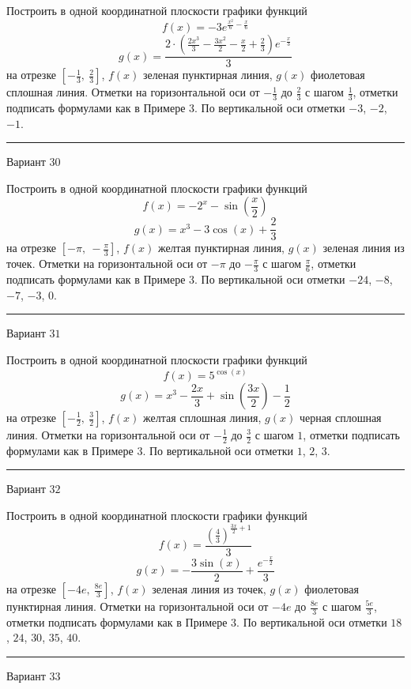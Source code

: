 \documentclass[11pt]{report}
\begin{document}
Построить в одной координатной плоскости графики функций $$f(x) = - 3 e^{\frac{x^{2}}{6} - \frac{x}{6}}$$ $$g(x) = \frac{2 \cdot \left(\frac{2 x^{3}}{3} - \frac{3 x^{2}}{2} - \frac{x}{2} + \frac{2}{3}\right) e^{- \frac{x}{3}}}{3}$$ на отрезке $\left[- \frac{1}{3}, \  \frac{2}{3}\right]$, $f(x)$ зеленая пунктирная линия, $g(x)$ фиолетовая сплошная линия. Отметки на горизонтальной оси от $- \frac{1}{3}$ до $\frac{2}{3}$ с шагом $\frac{1}{3}$, отметки подписать формулами как в Примере 3. По вертикальной оси отметки $-3$, $-2$, $-1$.
\begin{center}
\noindent\rule{8cm}{0.4pt}
\end{center}
Вариант $30$


Построить в одной координатной плоскости графики функций $$f(x) = - 2^{x} - \sin{\left(\frac{x}{2} \right)}$$ $$g(x) = x^{3} - 3 \cos{\left(x \right)} + \frac{2}{3}$$ на отрезке $\left[- \pi, \  - \frac{\pi}{3}\right]$, $f(x)$ желтая пунктирная линия, $g(x)$ зеленая линия из точек. Отметки на горизонтальной оси от $- \pi$ до $- \frac{\pi}{3}$ с шагом $\frac{\pi}{6}$, отметки подписать формулами как в Примере 3. По вертикальной оси отметки $-24$, $-8$, $-7$, $-3$, $0$.
\begin{center}
\noindent\rule{8cm}{0.4pt}
\end{center}
Вариант $31$


Построить в одной координатной плоскости графики функций $$f(x) = 5^{\cos{\left(x \right)}}$$ $$g(x) = x^{3} - \frac{2 x}{3} + \sin{\left(\frac{3 x}{2} \right)} - \frac{1}{2}$$ на отрезке $\left[- \frac{1}{2}, \  \frac{3}{2}\right]$, $f(x)$ желтая сплошная линия, $g(x)$ черная сплошная линия. Отметки на горизонтальной оси от $- \frac{1}{2}$ до $\frac{3}{2}$ с шагом $1$, отметки подписать формулами как в Примере 3. По вертикальной оси отметки $1$, $2$, $3$.
\begin{center}
\noindent\rule{8cm}{0.4pt}
\end{center}
Вариант $32$


Построить в одной координатной плоскости графики функций $$f(x) = \frac{\left(\frac{4}{3}\right)^{\frac{3 x}{2} + 1}}{3}$$ $$g(x) = - \frac{3 \sin{\left(x \right)}}{2} + \frac{e^{- \frac{x}{2}}}{3}$$ на отрезке $\left[- 4 e, \  \frac{8 e}{3}\right]$, $f(x)$ зеленая линия из точек, $g(x)$ фиолетовая пунктирная линия. Отметки на горизонтальной оси от $- 4 e$ до $\frac{8 e}{3}$ с шагом $\frac{5 e}{3}$, отметки подписать формулами как в Примере 3. По вертикальной оси отметки $18$, $24$, $30$, $35$, $40$.
\begin{center}
\noindent\rule{8cm}{0.4pt}
\end{center}
Вариант $33$
\end{document}
